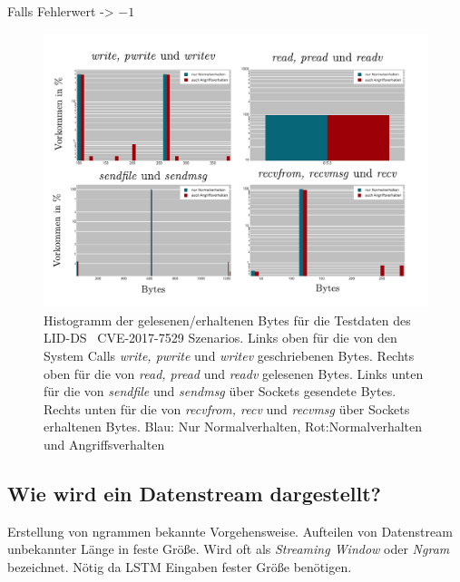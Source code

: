                 Falls Fehlerwert -> $-1$
                
                \begin{figure}[ht]
                    \centering
                    \includegraphics[width=\textwidth]{images/return_2017_plot.pdf}
                    \caption{Histogramm der gelesenen/erhaltenen Bytes für die Testdaten des LID-DS~\cite{LID-DS} CVE-2017-7529 Szenarios.
                    Links oben für die von den System Calls \textit{write, pwrite} und \textit{writev} geschriebenen Bytes.
                    Rechts oben für die von \textit{read, pread} und \textit{readv} gelesenen Bytes.
                    Links unten für die von \textit{sendfile} und \textit{sendmsg} über Sockets gesendete Bytes.
                    Rechts unten für die von \textit{recvfrom, recv} und \textit{recvmsg} über Sockets erhaltenen Bytes.
                    Blau: Nur Normalverhalten, Rot:Normalverhalten und Angriffsverhalten}
                    \label{fig:return_values}
                \end{figure}

%
        \subsection{Wie wird ein Datenstream dargestellt?}\label{sec:streamdarstellung}
            Erstellung von ngrammen bekannte Vorgehensweise.
            Aufteilen von Datenstream unbekannter Länge in feste Größe.
            Wird oft als \textit{Streaming Window} oder \textit{Ngram} bezeichnet.
            Nötig da \ac{LSTM} Eingaben fester Größe benötigen.

